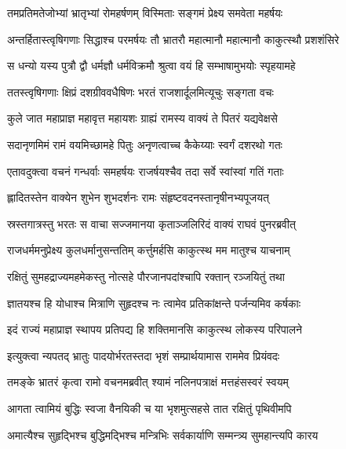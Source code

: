 
\twolineshloka
{तमप्रतिमतेजोभ्यां भ्रातृभ्यां रोमहर्षणम्}
{विस्मिताः सङ्गमं प्रेक्ष्य समवेता महर्षयः} %

\twolineshloka
{अन्तर्हितास्त्वृषिगणाः सिद्धाश्च परमर्षयः}
{तौ भ्रातरौ महात्मानौ महात्मानौ काकुत्स्थौ प्रशशंसिरे} %

\twolineshloka
{स धन्यो यस्य पुत्रौ द्वौ धर्मज्ञौ धर्मविक्रमौ}
{श्रुत्वा वयं हि सम्भाषामुभयोः स्पृहयामहे} %

\twolineshloka
{ततस्त्वृषिगणाः क्षिप्रं दशग्रीववधैषिणः}
{भरतं राजशार्दूलमित्यूचुः सङ्गता वचः} %

\twolineshloka
{कुले जात महाप्राज्ञ महावृत्त महायशः}
{ग्राह्यं रामस्य वाक्यं ते पितरं यद्यवेक्षसे} %

\twolineshloka
{सदानृणमिमं रामं वयमिच्छामहे पितुः}
{अनृणत्वाच्च कैकेय्याः स्वर्गं दशरथो गतः} %

\twolineshloka
{एतावदुक्त्वा वचनं गन्धर्वाः समहर्षयः}
{राजर्षयश्चैव तदा सर्वे स्वांस्वां गतिं गताः} %

\twolineshloka
{ह्लादितस्तेन वाक्येन शुभेन शुभदर्शनः}
{रामः संहृष्टवदनस्तानृषीनभ्यपूजयत्} %

\twolineshloka
{स्रस्तगात्रस्तु भरतः स वाचा सज्जमानया}
{कृताञ्जलिरिदं वाक्यं राघवं पुनरब्रवीत्} %

\twolineshloka
{राजधर्ममनुप्रेक्ष्य कुलधर्मानुसन्ततिम्}
{कर्त्तुमर्हसि काकुत्स्थ मम मातुश्च याचनाम्} %

\twolineshloka
{रक्षितुं सुमहद्राज्यमहमेकस्तु नोत्सहे}
{पौरजानपदांश्चापि रक्तान् रञ्जयितुं तथा} %

\twolineshloka
{ज्ञातयश्च हि योधाश्च मित्राणि सुहृदश्च नः}
{त्वामेव प्रतिकांक्षन्ते पर्जन्यमिव कर्षकाः} %

\twolineshloka
{इदं राज्यं महाप्राज्ञ स्थापय प्रतिपद्य हि}
{शक्तिमानसि काकुत्स्थ लोकस्य परिपालने} %

\twolineshloka
{इत्युक्त्वा न्यपतद् भ्रातुः पादयोर्भरतस्तदा}
{भृशं सम्प्रार्थयामास राममेव प्रियंवदः} %

\twolineshloka
{तमङ्के भ्रातरं कृत्वा रामो वचनमब्रवीत्}
{श्यामं नलिनपत्राक्षं मत्तहंसस्वरं स्वयम्} %

\twolineshloka
{आगता त्वामियं बुद्धिः स्वजा वैनयिकी च या}
{भृशमुत्सहसे तात रक्षितुं पृथिवीमपि} %

\twolineshloka
{अमात्यैश्च सुहृद्भिश्च बुद्धिमद्भिश्च मन्त्रिभिः}
{सर्वकार्याणि सम्मन्त्र्य सुमहान्त्यपि कारय} %

